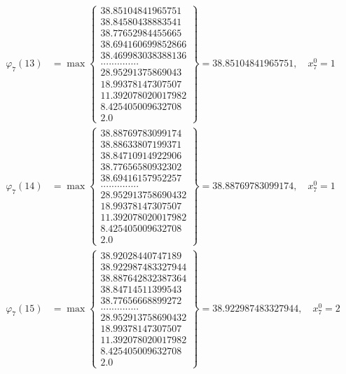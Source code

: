 \documentclass{article}
\begin{document}
\begin{align*}
  
  
  
\varphi_{7}(13) &= \max \left\{ \begin{array}{c}
38.85104841965751 \\
 38.84580438883541 \\
 38.77652984455665 \\
 38.694160699852866 \\
 38.469983038388136 \\
 .............. \\
 28.95291375869043 \\
 18.99378147307507 \\
 11.392078020017982 \\
 8.425405009632708 \\
 2.0
\end{array} \right\} = 38.85104841965751, \quad x_{7}^0 = 1\\
  
  
  
  
\varphi_{7}(14) &= \max \left\{ \begin{array}{c}
38.88769783099174 \\
 38.88633807199371 \\
 38.84710914922906 \\
 38.77656580932302 \\
 38.69416157952257 \\
 .............. \\
 28.952913758690432 \\
 18.99378147307507 \\
 11.392078020017982 \\
 8.425405009632708 \\
 2.0
\end{array} \right\} = 38.88769783099174, \quad x_{7}^0 = 1\\
  
  
  
  
\varphi_{7}(15) &= \max \left\{ \begin{array}{c}
38.92028440747189 \\
 38.922987483327944 \\
 38.887642832387364 \\
 38.84714511399543 \\
 38.77656668899272 \\
 .............. \\
 28.952913758690432 \\
 18.99378147307507 \\
 11.392078020017982 \\
 8.425405009632708 \\
 2.0
\end{array} \right\} = 38.922987483327944, \quad x_{7}^0 = 2\\
  

\end{align*}
\end{document}
